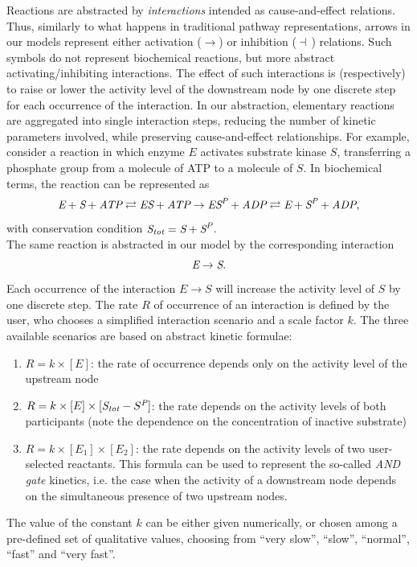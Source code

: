 Reactions are abstracted by \emph{interactions} intended as cause-and-effect relations. Thus,
similarly to what happens in traditional pathway representations, arrows in
our models represent either activation ($\rightarrow$) or inhibition ($\dashv$\,) relations.
Such symbols do not represent biochemical reactions, but more abstract activating/inhibiting interactions.
The effect of such interactions is (respectively)
to raise or lower the activity level of the downstream node by one discrete step for each occurrence of
the interaction. In our abstraction, elementary reactions are aggregated into single interaction steps,
reducing the number of kinetic parameters involved, while preserving cause-and-effect relationships.
For example, consider a reaction in which enzyme $E$ activates substrate kinase $S$, transferring
a phosphate group from a molecule of ATP to a molecule of $S$. In biochemical
terms, the reaction can be represented as
$$
\mbox{\it E} + \mbox{\it S} + \mbox{\it ATP} \rightleftarrows \mbox{\it ES} + \mbox{\it ATP} \rightarrow \mbox{\it ES}^{\mbox{\scriptsize \it P}} + \mbox{\it ADP} \rightleftarrows \mbox{\it E} + \mbox{\it S}^{\mbox{\scriptsize\it P}} + \mbox{\it ADP},
$$
with conservation condition $\mbox{\it S}_{\mbox{\scriptsize\it tot}} = \mbox{\it S} + \mbox{\it S}^{\mbox{\scriptsize\it P}}$.\\
The same reaction is abstracted in our model by the corresponding interaction
$$
\mbox{\it E} \rightarrow \mbox{\it S}.
$$
Each occurrence of the interaction $E \rightarrow S$ will increase the activity level of $S$ by one discrete step.
The rate $R$ of occurrence of an interaction is defined by the user, who chooses a simplified interaction scenario
and a scale factor $k$.
The three available scenarios are based on abstract kinetic formulae:
\begin{enumerate}
  \item $R = k \times [E]$: the rate of occurrence depends only on the activity level of the upstream node
  \item $R = k \times [E] \times [\mbox{\it S}_{\mbox{\scriptsize\it tot}} - S^{\mbox{\scriptsize\it P}}]$: the rate depends on the activity levels of both participants
(note the dependence on the concentration of inactive substrate)
  \item $R = k \times [E_1] \times [E_2]$: the rate depends on the activity levels of two user-selected reactants.
This formula can be used to represent the so-called
\emph{AND gate} kinetics, i.e. the case when the activity of a downstream node depends on the
simultaneous presence of two upstream nodes.
\end{enumerate}
The value of the constant $k$ can be either given numerically, or chosen among a pre-defined set of
qualitative values, choosing from ``very slow'', ``slow'', ``normal'', ``fast'' and ``very fast''.

